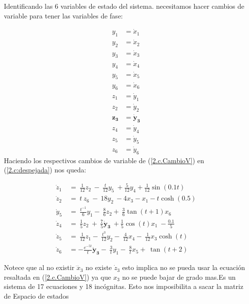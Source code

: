 \documentclass[letterpaper, 12pt]{article}
\begin{document}
\begin{enumerate}
\begin{enumerate}
Identificando las 6 variables de estado del sistema. necesitamos hacer cambios de variable para tener las variables de fase:

\begin{equation}
\begin{split}
    y_1 &= \dot{x}_1 \\
    y_2 &= \dot{x}_2 \\
    y_3 &= \dot{x}_3 \\
    y_4 &= \dot{x}_4 \\
    y_5 &= \dot{x}_5 \\
    y_6 &= \dot{x}_6 \\
    z_1 &= \dot{y}_1 \\
    z_2 &= \dot{y}_2 \\
    \mathbf{z_3} &\mathbf{= \dot{y}_3} \\ %
    z_4 &= \dot{y}_4 \\
    z_5 &= \dot{y}_5 \\
    z_6 &= \dot{y}_6  \label{2.c.CambioV}
\end{split} 
\end{equation}
Haciendo los respectivos cambios de variable de (\ref{2.c.CambioV}) en (\ref{2.c:despejada}) nos queda: 

\begin{equation}
\begin{split}
    {\dot{z}}_1\ &=\ \frac{1}{12}z_2\ -\ \frac{t}{12}y_5\ +\frac{5}{12}y_4+ \frac{1}{12} \sin(0.1t)  \\
    {\dot{z}}_2\ &= \ t\ z_6\ -\ 18y_2\ - 4x_3 - x_1 - t \cosh(0.5) \\
    {\dot{y}}_5\ &=\ \frac{t^{-1}}{6}y_1-\ \frac{8}{6}z_2+\ \frac{3}{6}\tan(t + 1)x_6 \\
    {\dot{z}}_4\ &=\ \frac{1}{5}z_2\ +\ \frac{7}{5}\mathbf{{\dot{y}}_3}\ +\frac{1}{5}\cos(t)x_1\ -\frac{0.1}{5}  \\ 
    {\dot{z}}_5\ &=\ \frac{1}{12}z_1-\ \frac{t^{3}}{12}y_2-\ \frac{4}{12}x_4-\ \frac{1}{12}x_3\cosh(t)  \\
    {\dot{z}}_6\ &= - \frac{e^{-5t}}{t} \mathbf{{\dot{y}}_3}-\ \frac{3}{t}{y}_1-\ \frac{8}{t}x_5+\ \tan(t + 2)
    \label{2.c:remplazada}
\end{split}
\end{equation}

Notece que al no existir $\dddot{x}_3$ no existe $\dot{z}_3$ esto implica no se pueda usar la ecuación resaltada en (\ref{2.c.CambioV}) ya que $x_3$ no se puede bajar de grado mas.Es un sistema de 17 ecuaciones y 18 incógnitas. Esto nos imposibilita a sacar la matriz de Espacio de estados




\end{enumerate}
\end{enumerate}
\end{document}
